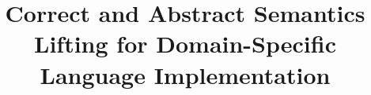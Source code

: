 \documentclass[acmsmall,review,anonymous]{acmart}\settopmatter{printfolios=true,printccs=false,printacmref=false}
\begin{document}
\title{Correct and Abstract Semantics Lifting for Domain-Specific Language Implementation}         %




\end{document}
